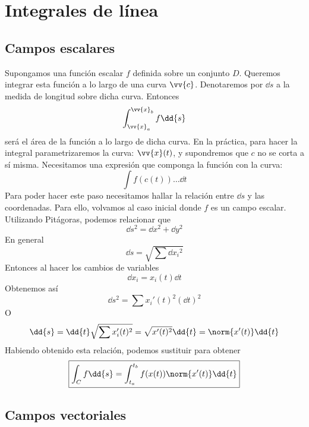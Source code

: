 \documentclass{./Calculo.tex}
\begin{document}
\section{Integrales de línea}
\subsection{Campos escalares}
Supongamos una función escalar $f$ definida sobre un conjunto $D$. Queremos
integrar esta función a lo largo de una curva $\vv{c}$. Denotaremos por
$ \dd{s}$ a la medida de longitud sobre dicha curva. Entonces
\[
	\int_{\vv{x}_{a}}^{\vv{x}_{b}}f \dd{s}
\]
será el área de la función a lo largo de dicha curva. En la práctica, para hacer
 la integral parametrizaremos la curva: $\vv{x}(t)$, y supondremos que $c$ no
 se corta a sí misma. Necesitamos una expresión que componga la función
 con la curva:
 \[
 	\int f(c(t)) \dots \dd{t}
 \]
 Para poder hacer este paso necesitamos hallar la relación entre $\dd{s}$ y
 las coordenadas. Para ello, volvamos al caso inicial donde $f$ es un campo
 escalar. Utilizando Pitágoras, podemos relacionar que
 \[
 	\dd{s} ^{2} = \dd{x} ^{2} + \dd{y} ^{2}
 \]
 En general
 \[
 	\dd{s} = \sqrt{\sum \dd{x_{i}}^{2}}
 \]
 Entonces al hacer los cambios de variables
 \[
 	\dd{x_{i}} = x_{i}(t) \dd{t}
 \]
 Obtenemos así
 \[
 	\dd{s} ^{2} = \sum x_{i}'(t)^{2} (\dd{t}) ^{2}
 \]
 O
 \[
 	\dd{s} = \dd{t} \sqrt{\sum x_{i}'(t)^{2}} = \sqrt{x'(t) ^{2}} \dd{t}
	= \norm{x'(t)} \dd{t}
 \]
 Habiendo obtenido esta relación, podemos sustituir para obtener
 \begin{equation}
 	\begin{split}
		\boxed{
		\int_{C} f \dd{s} = \int_{t_{a}}^{t_{b}} f(x(t))\norm{x'(t)} \dd{t}
	}
 	\end{split}
 \end{equation}
 \subsection{Campos vectoriales}
\end{document}
